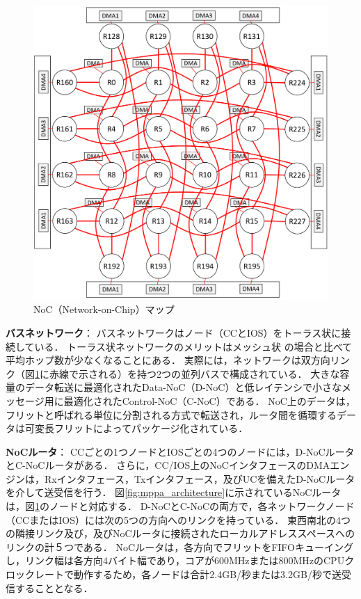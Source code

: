 \documentclass[submit,techrep]{ipsj_v2/UTF8/ipsj}
\begin{document}
\begin{figure}[t]
  \centering
  \includegraphics[width=0.65\linewidth]{../figure/noc_map.pdf}
  \caption{\label{fig:noc_map}
    NoC（Network-on-Chip）マップ}
\end{figure}

\textbf{バスネットワーク}：
バスネットワークはノード（CCとIOS）をトーラス状に接続している\cite{dally2001route}．
トーラス状ネットワークのメリットはメッシュ状\cite{vangal200780} \cite{taylor2002raw}の場合と比べて平均ホップ数が少なくなることにある．
実際には，ネットワークは双方向リンク（図\ref{fig:noc_map}に赤線で示される）を持つ2つの並列バスで構成されている．
大きな容量のデータ転送に最適化されたData-NoC（D-NoC）と低レイテンシで小さなメッセージ用に最適化されたControl-NoC（C-NoC）である．
NoC上のデータは，フリットと呼ばれる単位に分割される方式で転送され，ルータ間を循環するデータは可変長フリットによってパッケージ化されている．

\textbf{NoCルータ}：
CCごとの1つノードとIOSごとの4つのノードには，D-NoCルータとC-NoCルータがある．
さらに，CC/IOS上のNoCインタフェースのDMAエンジンは，Rxインタフェース，Txインタフェース，及びUCを備えたD-NoCルータを介して送受信を行う．
図\ref{fig:mppa_architecture}に示されているNoCルータは，図\ref{fig:noc_map}のノードと対応する．
D-NoCとC-NoCの両方で，各ネットワークノード（CCまたはIOS）には次の5つの方向へのリンクを持っている．
東西南北の4つの隣接リンク及び，及びNoCルータに接続されたローカルアドレススペースへのリンクの計５つである．
NoCルータは，各方向でフリットをFIFOキューイングし，リンク幅は各方向4バイト幅であり，コアが600MHzまたは800MHzのCPUクロックレートで動作するため，各ノードは合計2.4GB/秒または3.2GB/秒で送受信することとなる．
\end{document}
